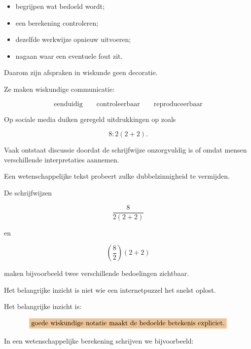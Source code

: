\documentclass{ximera}
\begin{document}
\begin{oefening}{\oefU \ESS}
\begin{itemize}
  \item begrijpen wat bedoeld wordt;
  \item een berekening controleren;
  \item dezelfde werkwijze opnieuw uitvoeren;
  \item nagaan waar een eventuele fout zit.
\end{itemize}

Daarom zijn afspraken in wiskunde geen decoratie.

Ze maken wiskundige communicatie:

\[
\boxed{
\text{eenduidig}
\qquad
\text{controleerbaar}
\qquad
\text{reproduceerbaar}
}
\]




Op sociale media duiken geregeld uitdrukkingen op zoals

\[
8:2(2+2).
\]

Vaak ontstaat discussie doordat de schrijfwijze onzorgvuldig is of
omdat mensen verschillende interpretaties aannemen.

Een wetenschappelijke tekst probeert zulke dubbelzinnigheid te
vermijden.

De schrijfwijzen

\[
\frac{8}{2(2+2)}
\]

en

\[
\left(\frac82\right)(2+2)
\]

maken bijvoorbeeld twee verschillende bedoelingen zichtbaar.

\begin{opmerking}
Het belangrijke inzicht is niet wie een internetpuzzel het snelst
oplost.

Het belangrijke inzicht is:

\[
\important{
\text{goede wiskundige notatie maakt de bedoelde betekenis expliciet.}
}
\]
\end{opmerking}




In een wetenschappelijke berekening schrijven we bijvoorbeeld:


\end{oefening}
\end{document}
